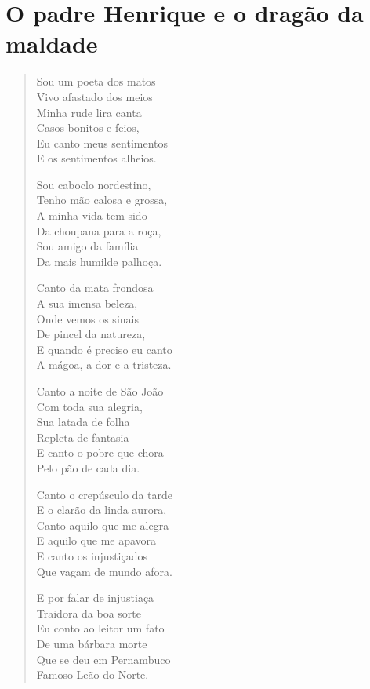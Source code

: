 \chapter{O padre Henrique e o dragão da maldade}

\begin{verse}
Sou um poeta dos matos\\
Vivo afastado dos meios\\
Minha rude lira canta\\
Casos bonitos e feios,\\
Eu canto meus sentimentos\\
E os sentimentos alheios.

Sou caboclo nordestino,\\
Tenho mão calosa e grossa,\\
A minha vida tem sido\\
Da choupana para a roça,\\
Sou amigo da família\\
Da mais humilde palhoça.

Canto da mata frondosa\\
A sua imensa beleza,\\
Onde vemos os sinais\\
De pincel da natureza,\\
E quando é preciso eu canto\\
A mágoa, a dor e a tristeza.

Canto a noite de São João\\
Com toda sua alegria,\\
Sua latada de folha\\
Repleta de fantasia\\
E canto o pobre que chora\\
Pelo pão de cada dia.

Canto o crepúsculo da tarde\\
E o clarão da linda aurora,\\
Canto aquilo que me alegra\\
E aquilo que me apavora\\
E canto os injustiçados\\
Que vagam de mundo afora.

E por falar de injustiaça\\
Traidora da boa sorte\\
Eu conto ao leitor um fato\\
De uma bárbara morte\\
Que se deu em Pernambuco\\
Famoso Leão do Norte.


\end{verse}
